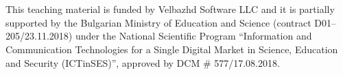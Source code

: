 \documentclass[a4paper,12pt]{minimal}
\begin{document}
\begin{Form}[action=mailto:todor.balabanov@gmail.com,encoding=text,method=post]
\\ \\

{\ssmall This teaching material is funded by Velbazhd Software LLC and it is partially supported by the Bulgarian Ministry of Education and Science (contract D01–205/23.11.2018) under the National Scientific Program ``Information and Communication Technologies for a Single Digital Market in Science, Education and Security (ICTinSES)'', approved by DCM \# 577/17.08.2018.}

\end{Form}
\end{document}
